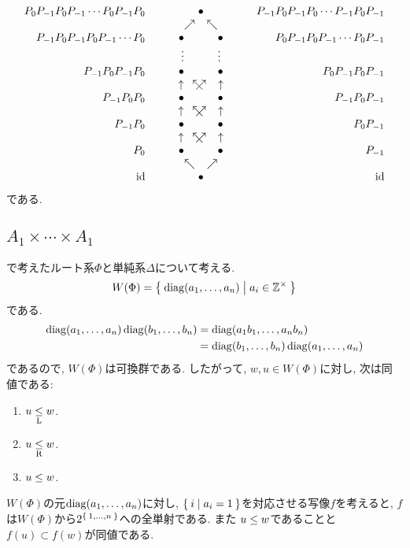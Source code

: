 \begin{align*}
  \begin{array}{crcccccrc}
    &P_0P_{-1}P_0P_{-1}\cdots P_{0}P_{-1}P_0&&&\bullet&&&P_{-1}P_0P_{-1}P_{0}\cdots P_{-1}P_0P_{-1}\\
    &&&&\nearrow\phantom{\bullet}\nwarrow&\\
    &P_{-1}P_0P_{-1}P_0P_{-1}\cdots P_{0}&&&\bullet\phantom{\nearrow\bullet\nwarrow}\bullet&&&P_0P_{-1}P_{0}P_{-1}\cdots P_0P_{-1}\\
    &&&&\vdots\phantom{\nearrow\bullet\swarrow}\vdots\\
    &P_{-1}P_0P_{-1}P_0&&&\bullet\phantom{\nearrow\bullet\nwarrow}\bullet&&&P_{0}P_{-1}P_{0}P_{-1}\\
    &&&&\uparrow\phantom{\bullet}\xarrow\phantom{\bullet}\uparrow&\\
    &P_{-1}P_0P_0&&&\bullet\phantom{\nearrow\bullet\nwarrow}\bullet&&&P_{-1}P_0P_{-1}\\
    &&&&\uparrow\phantom{\bullet}\xarrow\phantom{\bullet}\uparrow&\\
    &P_{-1}P_0&&&\bullet\phantom{\nearrow\bullet\nwarrow}\bullet&&&P_0P_{-1}\\
    &&&&\uparrow\phantom{\bullet}\xarrow\phantom{\bullet}\uparrow&\\
    &P_0&&&\bullet\phantom{\nearrow\bullet\nwarrow}\bullet&&&P_{-1}&\\
    &&&&\nwarrow\phantom{\bullet}\nearrow&\\
    &\id &&&\bullet &&&\id
  \end{array}
\end{align*}
である.

\subsection{$A_{1}\times\cdots\times A_{1}$}
で考えたルート系$\Phi$と単純系$\Delta$について考える.
\begin{align*}
  W(\Phi)=\Set{\operatorname{diag}(a_1,\ldots,a_n)|a_i\in \mathbb{Z}^\times}
\end{align*}
である.
\begin{align*}
  \operatorname{diag}(a_1,\ldots,a_n)\operatorname{diag}(b_1,\ldots,b_n)
  &=\operatorname{diag}(a_1b_1,\ldots,a_nb_n)\\
  &=\operatorname{diag}(b_1,\ldots,b_n)\operatorname{diag}(a_1,\ldots,a_n)
\end{align*}
であるので, $W(\Phi)$は可換群である.
したがって, $w,u\in W(\Phi)$に対し, 次は同値である:
\begin{enumerate}
  \item $u\mathrel{\underset{\text{L}}{\leq}} w$.
  \item $u\mathrel{\underset{\text{R}}{\leq}} w$.
  \item $u\mathrel{\leq} w$.
\end{enumerate}
$W(\Phi)$の元$\operatorname{diag}(a_1,\ldots,a_n)$に対し,
$\Set{i |a_i=1}$を対応させる写像$f$を考えると,
$f$は$W(\Phi)$から$2^{\Set{1,\ldots,n}}$への全単射である.
また
$u\mathrel{\leq} w$であることと$f(u)\subset f(w)$が同値である.



